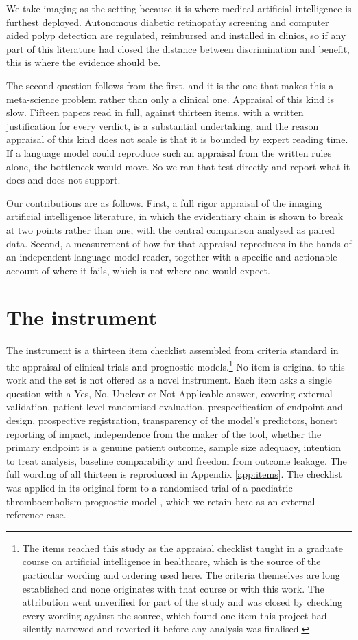 \documentclass{article}
\begin{document}
We take imaging as the setting because it is where medical artificial intelligence is furthest
deployed. Autonomous diabetic retinopathy screening and computer aided polyp detection are
regulated, reimbursed and installed in clinics, so if any part of this literature had closed the
distance between discrimination and benefit, this is where the evidence should be.

The second question follows from the first, and it is the one that makes this a meta-science
problem rather than only a clinical one. Appraisal of this kind is slow. Fifteen papers read in
full, against thirteen items, with a written justification for every verdict, is a substantial
undertaking, and the reason appraisal of this kind does not scale is that it is bounded by expert
reading time. If a language model could reproduce such an appraisal from the written rules alone,
the bottleneck would move. So we ran that test directly and report what it does and does not
support.

Our contributions are as follows. First, a full rigor appraisal of the imaging artificial
intelligence literature, in which the evidentiary chain is shown to break at two points rather than
one, with the central comparison analysed as paired data. Second, a measurement of how far that
appraisal reproduces in the hands of an independent language model reader, together with a specific
and actionable account of where it fails, which is not where one would expect.

\section{The instrument}

The instrument is a thirteen item checklist assembled from criteria standard in the appraisal of
clinical trials and prognostic models.\footnote{The items reached this study as the appraisal
checklist taught in a graduate course on artificial intelligence in healthcare, which is the source
of the particular wording and ordering used here. The criteria themselves are long established and
none originates with that course or with this work. The attribution went unverified for part of the
study and was closed by checking every wording against the source, which found one item this project
had silently narrowed and reverted it before any analysis was finalised.} No item is original to this
work and the set is not offered as a novel instrument. Each item asks a single question with a Yes, No, Unclear or Not Applicable
answer, covering external validation, patient level randomised evaluation, prespecification of
endpoint and design, prospective registration, transparency of the model's predictors, honest
reporting of impact, independence from the maker of the tool, whether the primary endpoint is a
genuine patient outcome, sample size adequacy, intention to treat analysis, baseline comparability
and freedom from outcome leakage. The full wording of all thirteen is reproduced in Appendix
\ref{app:items}. The checklist was applied in its original form to a randomised trial of a
paediatric thromboembolism prognostic model \cite{walker2023}, which we retain here as an external
reference case.
\end{document}

